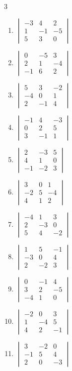\begin{multicols}{3}
\begin{enumerate}[label=\arabic*.,  leftmargin=*]
\item $\begin{vmatrix} -3 & 4 & 2 \\ 1 & -1 & -5 \\ 5 & 3 & 0 \end{vmatrix}$
\item $\begin{vmatrix} 0 & -5 & 3 \\ 2 & 1 & -4 \\ -1 & 6 & 2 \end{vmatrix}$
\item $\begin{vmatrix} 5 & 3 & -2 \\ -4 & 0 & 1 \\ 2 & -1 & 4 \end{vmatrix}$
\item $\begin{vmatrix} -1 & 4 & -3 \\ 0 & 2 & 5 \\ 3 & -1 & 1 \end{vmatrix}$
\item $\begin{vmatrix} 2 & -3 & 5 \\ 4 & 1 & 0 \\ -1 & -2 & 3 \end{vmatrix}$
\item $\begin{vmatrix} 3 & 0 & 1 \\ -2 & 5 & -4 \\ 4 & 1 & 2 \end{vmatrix}$
\item $\begin{vmatrix} -4 & 1 & 3 \\ 2 & -3 & 0 \\ 5 & 4 & -2 \end{vmatrix}$
\item $\begin{vmatrix} 1 & 5 & -1 \\ -3 & 0 & 4 \\ 2 & -2 & 3 \end{vmatrix}$
\item $\begin{vmatrix} 0 & -1 & 4 \\ 3 & 2 & -5 \\ -4 & 1 & 0 \end{vmatrix}$
\item $\begin{vmatrix} -2 & 0 & 3 \\ 1 & -4 & 5 \\ 4 & 2 & -1 \end{vmatrix}$
\item $\begin{vmatrix} 3 & -2 & 0 \\ -1 & 5 & 4 \\ 2 & 0 & -3 \end{vmatrix}$
\end{enumerate}
\end{multicols}

